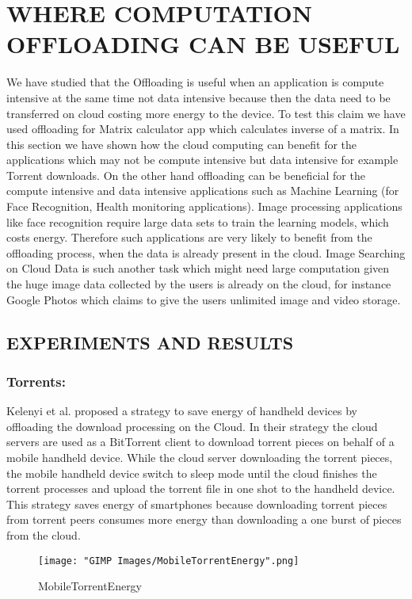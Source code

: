 \documentclass[12pt]{report}
\begin{document}
\chapter{WHERE COMPUTATION OFFLOADING CAN BE USEFUL}
We have studied that the Offloading is useful when an application is compute intensive at the same time not data intensive because then the data need to be transferred on cloud costing more energy to the device. To test this claim we have used offloading for Matrix calculator app which calculates inverse of a matrix.
In this section we have shown how the cloud computing can benefit for the applications which may not be compute intensive but data intensive for example Torrent downloads. On the other hand offloading can be beneficial for the compute intensive and data intensive applications such as Machine Learning (for Face Recognition, Health monitoring applications). Image processing applications like face recognition require large data sets to train the learning models, which costs energy. Therefore such applications are very likely to benefit from the offloading process, when the data is already present in the cloud. Image Searching on Cloud Data is such another task which might need large computation given the huge image data collected by the users is already on the cloud, for instance Google Photos which claims to give the users unlimited image and video storage. 

\section{EXPERIMENTS AND RESULTS}
\subsection{Torrents:}
Kelenyi et al. \cite{kelenyi2010cloudtorrent} proposed a strategy to save energy of handheld devices by offloading the download processing on the Cloud. In their strategy the cloud servers are used as a BitTorrent client to download torrent pieces on behalf of a mobile handheld device. While the cloud server downloading the torrent pieces, the mobile handheld device switch to sleep mode until the cloud finishes the torrent processes and upload the torrent file in one shot to the handheld device. This strategy saves energy of smartphones because downloading torrent pieces from torrent peers consumes more energy than downloading a one burst of pieces from the cloud. 
\begin{figure}[h]
  \centering
  \texttt{[image: "GIMP Images/MobileTorrentEnergy".png]}
  \caption{MobileTorrentEnergy}
  \label{fig:MobileTorrentEnergy}
\end{figure}
\end{document}
